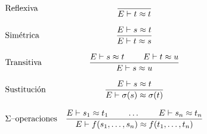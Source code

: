 \[
  \begin{array}{lc}
    $Reflexiva$     & \dfrac{}{E \vdash t \approx t} \\ \\
    $Sim\'{e}trica$         & \dfrac{E \vdash s \approx t}{E \vdash t \approx s} \\ \\
    $Transitiva$    & \dfrac{E \vdash s \approx t  \hspace{.8cm}   E \vdash t \approx u}{E \vdash s \approx u} \\ \\
    $Sustitución$   & \dfrac{E \vdash s\approx t}{E \vdash \sigma(s)\approx \sigma(t)} \\ \\
    \Sigma$--operaciones$    & \dfrac{E \vdash s_1\approx t_1 \hspace{.8cm} \dots \hspace{.8cm} E \vdash s_n\approx t_n}{E \vdash f(s_1, \dots, s_n) \approx f(t_1,\dots,t_n)}
  \end{array} 
\]


